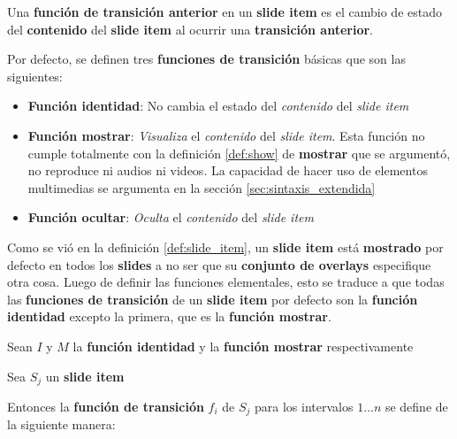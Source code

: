 		\begin{definition}
		\label{def:prev_transition_func}
			Una \textbf{función de transición anterior} en un \textbf{slide item} es el cambio de estado del \textbf{contenido} del \textbf{slide item} al ocurrir una \textbf{transición anterior}.
		\end{definition}

		Por defecto, se definen tres \textbf{funciones de transición} básicas que son las siguientes:
		\begin{itemize}
			\item \textbf{Función identidad}: No cambia el estado del \textit{contenido} del \textit{slide item}
			\item \textbf{Función mostrar}: \textit{Visualiza} el \textit{contenido} del \textit{slide item}. Esta función no cumple totalmente con la definición \ref{def:show} de \textbf{mostrar} que se argumentó, no reproduce ni audios ni videos. La capacidad de hacer uso de elementos multimedias se argumenta en la sección \ref{sec:sintaxis_extendida} 
			\item \textbf{Función ocultar}: \textit{Oculta} el \textit{contenido} del \textit{slide item}
		\end{itemize}

		Como se vió en la definición \ref{def:slide_item}, un \textbf{slide item} está \textbf{mostrado} por defecto en todos los \textbf{slides} a no ser que su \textbf{conjunto de overlays} especifique otra cosa. Luego de definir las funciones elementales, esto se traduce a que todas las \textbf{funciones de transición} de un \textbf{slide item} por defecto son la \textbf{función identidad} excepto la primera, que es la \textbf{función mostrar}. 


 		Sean \( I \) y \( M \) la \textbf{función identidad} y la \textbf{función mostrar} respectivamente


        Sea \( S_j \) un \textbf{slide item}

        Entonces la \textbf{función de transición} \( f_i \) de \( S_j \) para los intervalos \( 1 \dots n \) se define de la siguiente manera:

